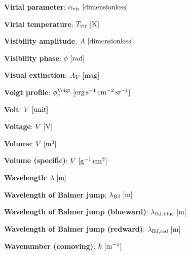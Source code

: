 \documentclass[a4paper,10pt]{article}
\begin{document}
{\noindent}\textbf{Virial parameter}: $\alpha_\mathrm{vir} ~ [{\rm dimensionless}]$

{\noindent}\textbf{Virial temperature}: $T_\mathrm{vir} ~
[{\rm K}]$

{\noindent}\textbf{Visibility amplitude}: $A ~ [{\rm dimensionless}]$

{\noindent}\textbf{Visibility phase}: $\phi ~ [{\rm rad}]$

{\noindent}\textbf{Visual extinction}: $A_V ~ [{\rm mag}]$

{\noindent}\textbf{Voigt profile}: $\phi_\nu^{\rm Voigt}  ~ [{\rm erg\,s^{-1}\,cm^{-2}\,sr^{-1}}]$

{\noindent}\textbf{Volt}: $V ~ [{\rm unit}]$

{\noindent}\textbf{Voltage}: $V ~ [{\rm V}]$

{\noindent}\textbf{Volume}: $V ~ [{\rm m^3}]$

{\noindent}\textbf{Volume (specific)}: $V ~ [{\rm g^{-1}\,cm^3}]$

{\noindent}\textbf{Wavelength}: $\lambda ~ [{\rm m}]$

{\noindent}\textbf{Wavelength of Balmer jump}: $\lambda_{\rm BJ} ~ [{\rm m}]$

{\noindent}\textbf{Wavelength of Balmer jump (blueward)}: $\lambda_{\rm BJ,blue} ~ [{\rm m}]$

{\noindent}\textbf{Wavelength of Balmer jump (redward)}: $\lambda_{\rm BJ,red} ~ [{\rm m}]$

{\noindent}\textbf{Wavenumber (comoving)}: $k ~ [{\rm m^{-1}}]$





































\end{document}
